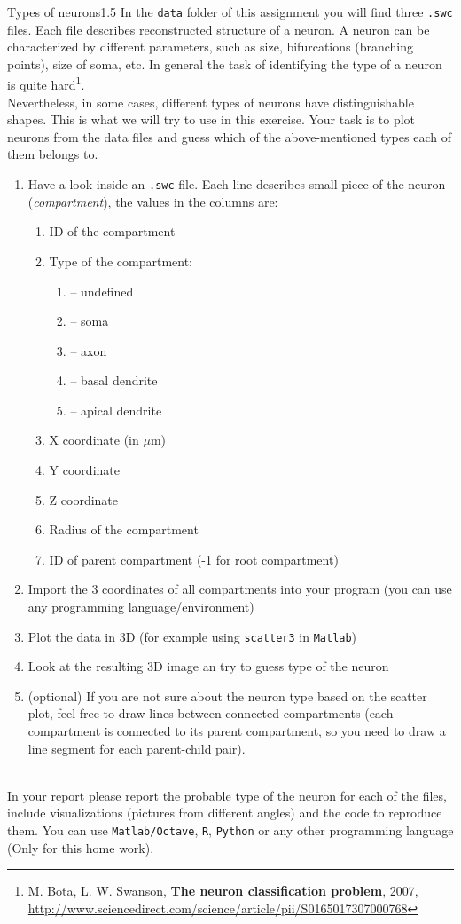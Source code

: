 \documentclass[a4paper,11pt]{article}
\begin{document}
\begin{exercise}{3}{Types of neurons}{1.5}
In the \texttt{data} folder of this assignment you will find three \texttt{.swc} files. Each file describes reconstructed structure of a neuron. A neuron can be characterized by different parameters, such as size, bifurcations (branching points), size of soma, etc. In general the task of identifying the type of a neuron is quite hard\footnote{M. Bota, L. W. Swanson, \textbf{The neuron classification problem}, 2007, 
\url{http://www.sciencedirect.com/science/article/pii/S0165017307000768}}. \\
Nevertheless, in some cases, different types of neurons have distinguishable shapes. This is what we will try to use in this exercise. Your task is to plot neurons from the data files and guess which of the above-mentioned types each of them belongs to.
\begin{enumerate}
	\item Have a look inside an \texttt{.swc} file. Each line describes small piece of the neuron (\emph{compartment}), the values in the columns are: 
	\begin{enumerate}
		\item ID of the compartment
		\item Type of the compartment:
		\begin{enumerate}
			\item[0] -- undefined
			\item[1] -- soma
			\item[2] -- axon
			\item[3] -- basal dendrite
			\item[4] -- apical dendrite
		\end{enumerate}
		\item X coordinate (in $\mu$m)
		\item Y coordinate
		\item Z coordinate	
		\item Radius of the compartment
		\item ID of parent compartment (-1 for root compartment)
	\end{enumerate}
	\item Import the 3 coordinates of all compartments into your program (you can use any programming language/environment)
	\item Plot the data in 3D (for example using \texttt{scatter3} in \texttt{Matlab})
	\item Look at the resulting 3D image an try to guess type of the neuron
	\item (optional) If you are not sure about the neuron type based on the scatter plot, feel free to draw lines between connected compartments (each compartment is connected to its parent compartment, so you need to draw a line segment for each parent-child pair).
\end{enumerate}
\ \\
In your report please report the probable type of the neuron for each of the files, include visualizations (pictures from different angles) and the code to reproduce them. You can use \texttt{Matlab/Octave}, \texttt{R}, \texttt{Python} or any other programming language (Only for this home work).
\end{exercise}
\end{document}
